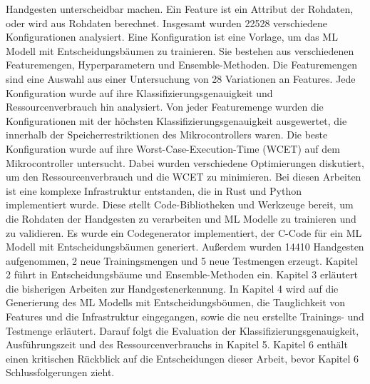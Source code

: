 Handgesten unterscheidbar machen. Ein Feature ist ein Attribut der Rohdaten, oder wird aus Rohdaten berechnet.
\newline
\newline
Insgesamt wurden 22528 verschiedene Konfigurationen analysiert. Eine Konfiguration ist eine Vorlage, um das ML Modell mit Entscheidungsbäumen zu trainieren. Sie bestehen aus verschiedenen Featuremengen,
Hyperparametern und Ensemble-Methoden. Die Featuremengen sind eine Auswahl aus einer Untersuchung von 28 Variationen an Features. Jede Konfiguration wurde auf ihre Klassifizierungsgenauigkeit und Ressourcenverbrauch
hin analysiert. Von jeder Featuremenge wurden die Konfigurationen mit der höchsten Klassifizierungsgenauigkeit ausgewertet, die innerhalb der Speicherrestriktionen des Mikrocontrollers waren. Die beste
Konfiguration wurde auf ihre Worst-Case-Execution-Time (WCET) auf dem Mikrocontroller untersucht. Dabei wurden verschiedene Optimierungen diskutiert, um den Ressourcenverbrauch und die WCET zu minimieren.
Bei diesen Arbeiten ist eine komplexe Infrastruktur entstanden, die in Rust und Python implementiert wurde. Diese stellt Code-Bibliotheken und Werkzeuge bereit, um die Rohdaten der Handgesten zu verarbeiten und
ML Modelle zu trainieren und zu validieren. Es wurde ein Codegenerator implementiert, der C-Code für ein ML Modell mit Entscheidungsbäumen generiert. Außerdem wurden 14410 Handgesten aufgenommen,
2 neue Trainingsmengen und 5 neue Testmengen erzeugt.
\newline
\newline
Kapitel 2 führt in Entscheidungsbäume und Ensemble-Methoden ein. Kapitel 3 erläutert die bisherigen Arbeiten zur Handgestenerkennung. In Kapitel 4 wird auf die Generierung des ML Modells mit Entscheidungsböumen,
die Tauglichkeit von Features und die Infrastruktur eingegangen, sowie die neu erstellte Trainings- und Testmenge erläutert. Darauf folgt die Evaluation der Klassifizierungsgenauigkeit, Ausführungszeit
und des Ressourcenverbrauchs in Kapitel 5. Kapitel 6 enthält einen kritischen Rückblick auf die Entscheidungen dieser Arbeit, bevor Kapitel 6 Schlussfolgerungen zieht.